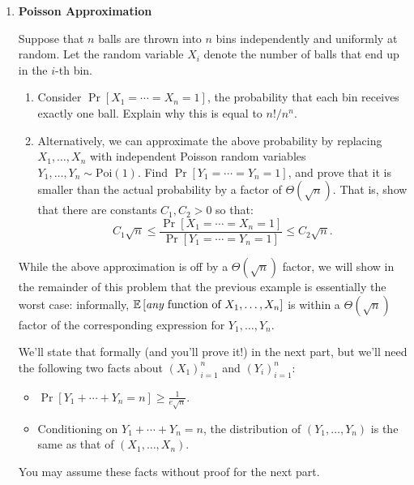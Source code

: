 \begin{enumerate}

\item {} \textbf{Poisson Approximation}

Suppose that $n$ balls are thrown into $n$ bins independently and uniformly at random. Let the random variable $X_i$ denote the number of balls that end up in the $i$-th bin.

\begin{enumerate}
\item {} 
Consider $\Pr[X_1 = \cdots = X_n = 1]$, the probability that each bin receives exactly one ball.  Explain why this is equal to $n!/n^n$.

\item {} Alternatively, we can approximate the above probability by replacing $X_1, \ldots, X_n$ with independent Poisson random variables $Y_1, \ldots, Y_n \sim \mathrm{Poi}(1)$. Find $\Pr[Y_1 = \cdots = Y_n = 1]$, and prove that it is smaller than the actual probability by a factor of $\Theta(\sqrt{n})$.  That is, show that there are constants $C_1, C_2 > 0$ so that:
\begin{equation}\label{eq:p3-special}
    C_1\sqrt{n}
\le \frac{\Pr[X_1 = \cdots = X_n = 1]}{\Pr[Y_1 = \cdots = Y_n = 1]}
\le C_2\sqrt{n}.
\end{equation}
\end{enumerate}
While the above approximation is off by a $\Theta(\sqrt{n})$ factor, we will show in the remainder of this problem that the previous example is essentially the worst case: informally, 
$\operatorname*{\mathbb{E}}\left[ \text{\em any \em function of $X_1, \ldots, X_n$} \right]$ is within a $\Theta(\sqrt{n})$ factor of the corresponding expression for $Y_1, \ldots, Y_n$.

We'll state that formally (and you'll prove it!) in the next part, but we'll need the following two facts about $(X_1)_{i=1}^n$ and $(Y_i)_{i=1}^n$:
\begin{itemize}
\item $\Pr[Y_1 + \cdots + Y_n = n] \ge \frac{1}{e\sqrt{n}}$.
\item Conditioning on $Y_1 + \cdots + Y_n = n$, the distribution of $(Y_1, \ldots, Y_n)$ is the same as that of $(X_1, \ldots, X_n)$.
\end{itemize}
You may assume these facts without proof for the next part.

\begin{enumerate}[start=3]


\end{enumerate}
\end{enumerate}
